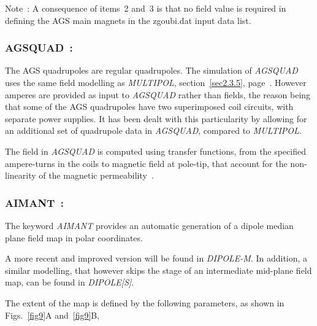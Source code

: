 \bigskip

  \noindent Note~: A consequence of  items~2 and~3 is that  no field value is required in defining the AGS main magnets in 
the  zgoubi.dat input data list. 




\newpage

\subsubsection*{AGSQUAD~:  \AGSQUADTitl} \label{AGSQUAD}
\medskip 

The AGS quadrupoles are regular quadrupoles. 
The simulation of  \textsl{AGSQUAD}  uses the same field modelling as \textsl{MULTIPOL}, 
section~\ref{sec2.3.5}, page~\pageref{sec2.3.5}.  However amperes are provided as input to 
 \textsl{AGSQUAD} rather than fields, the reason being that 
 some of the AGS quadrupoles  have two superimposed coil circuits, with separate power supplies. 
It has been dealt with this 
particularity by allowing  for an additional set of quadrupole data in \textsl{AGSQUAD}, compared to \textsl{MULTIPOL}. 

\bigskip

\noindent The field in \textsl{AGSQUAD} is computed using transfer functions, from the specified ampere-turns in the coils to 
magnetic field at pole-tip, that  account for the non-linearity of the magnetic permeability~\cite{MADXAGSModel}. 



\newpage



\subsubsection*{AIMANT~:  \AIMANTTitl}\label{AIMANT}
\medskip

The keyword \textsl{AIMANT} provides an automatic
generation of a dipole median plane field map in polar coordinates. 

\medskip
\noindent A more recent and improved version will be 
found in \textsl{DIPOLE-M}. In addition, a similar modelling, that however skips 
the stage of an intermediate mid-plane field map, can be found in  \textsl{DIPOLE[S]}.

\medskip
\noindent The extent of the map is defined by the 
following parameters, as shown in Figs.~\ref{fig9}A and~\ref{fig9}B, 

